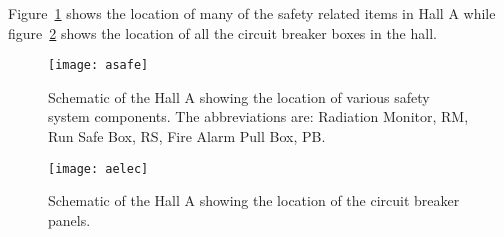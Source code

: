 Figure~\ref{fig:asafe} shows the location of
many of the safety related items in Hall A while
figure~\ref{fig:aelec} shows the location of all the circuit
breaker boxes in the hall.

\begin{figure}
\begin{center}
\texttt{[image: asafe]}
{\linespread{1.}
\caption[Introduction: Location of Hall Safety Items ]{Schematic
of the Hall A showing the location of various safety system
components. The abbreviations are: Radiation Monitor, RM, Run
Safe Box, RS, Fire Alarm Pull Box, PB. }
\label{fig:asafe}}
\end{center}
\end{figure}

\begin{figure}
\begin{center}
\texttt{[image: aelec]}
{\linespread{1.}
\caption[Introduction: Location of Circuit Breakers]{Schematic of
the Hall A showing the location of the circuit breaker panels.}
\label{fig:aelec}}
\end{center}
\end{figure}
%
%
%
%
%
